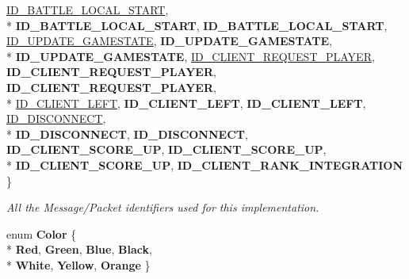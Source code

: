 \begin{DoxyCompactItemize}
\hyperlink{namespace_champ_net_plugin_a2ade5cfa7cf6c25ab7236c6b54a57821ab54454887b51006a69a632ca6a13aab6}{I\-D\-\_\-\-B\-A\-T\-T\-L\-E\-\_\-\-L\-O\-C\-A\-L\-\_\-\-S\-T\-A\-R\-T}, 
\\*
{\bfseries I\-D\-\_\-\-B\-A\-T\-T\-L\-E\-\_\-\-L\-O\-C\-A\-L\-\_\-\-S\-T\-A\-R\-T}, 
{\bfseries I\-D\-\_\-\-B\-A\-T\-T\-L\-E\-\_\-\-L\-O\-C\-A\-L\-\_\-\-S\-T\-A\-R\-T}, 
\hyperlink{namespace_champ_net_plugin_a2ade5cfa7cf6c25ab7236c6b54a57821a6c390584862af2434c946e375365fe02}{I\-D\-\_\-\-U\-P\-D\-A\-T\-E\-\_\-\-G\-A\-M\-E\-S\-T\-A\-T\-E}, 
{\bfseries I\-D\-\_\-\-U\-P\-D\-A\-T\-E\-\_\-\-G\-A\-M\-E\-S\-T\-A\-T\-E}, 
\\*
{\bfseries I\-D\-\_\-\-U\-P\-D\-A\-T\-E\-\_\-\-G\-A\-M\-E\-S\-T\-A\-T\-E}, 
\hyperlink{namespace_champ_net_plugin_a2ade5cfa7cf6c25ab7236c6b54a57821a95ea635e1f4775e77d635b7039a9711e}{I\-D\-\_\-\-C\-L\-I\-E\-N\-T\-\_\-\-R\-E\-Q\-U\-E\-S\-T\-\_\-\-P\-L\-A\-Y\-E\-R}, 
{\bfseries I\-D\-\_\-\-C\-L\-I\-E\-N\-T\-\_\-\-R\-E\-Q\-U\-E\-S\-T\-\_\-\-P\-L\-A\-Y\-E\-R}, 
{\bfseries I\-D\-\_\-\-C\-L\-I\-E\-N\-T\-\_\-\-R\-E\-Q\-U\-E\-S\-T\-\_\-\-P\-L\-A\-Y\-E\-R}, 
\\*
\hyperlink{namespace_champ_net_plugin_a2ade5cfa7cf6c25ab7236c6b54a57821a170a6a655b34086567c4039a8e9ba81d}{I\-D\-\_\-\-C\-L\-I\-E\-N\-T\-\_\-\-L\-E\-F\-T}, 
{\bfseries I\-D\-\_\-\-C\-L\-I\-E\-N\-T\-\_\-\-L\-E\-F\-T}, 
{\bfseries I\-D\-\_\-\-C\-L\-I\-E\-N\-T\-\_\-\-L\-E\-F\-T}, 
\hyperlink{namespace_champ_net_plugin_a2ade5cfa7cf6c25ab7236c6b54a57821ab64ca706dd3c8029ea9dc9a239237e15}{I\-D\-\_\-\-D\-I\-S\-C\-O\-N\-N\-E\-C\-T}, 
\\*
{\bfseries I\-D\-\_\-\-D\-I\-S\-C\-O\-N\-N\-E\-C\-T}, 
{\bfseries I\-D\-\_\-\-D\-I\-S\-C\-O\-N\-N\-E\-C\-T}, 
{\bfseries I\-D\-\_\-\-C\-L\-I\-E\-N\-T\-\_\-\-S\-C\-O\-R\-E\-\_\-\-U\-P}, 
{\bfseries I\-D\-\_\-\-C\-L\-I\-E\-N\-T\-\_\-\-S\-C\-O\-R\-E\-\_\-\-U\-P}, 
\\*
{\bfseries I\-D\-\_\-\-C\-L\-I\-E\-N\-T\-\_\-\-S\-C\-O\-R\-E\-\_\-\-U\-P}, 
{\bfseries I\-D\-\_\-\-C\-L\-I\-E\-N\-T\-\_\-\-R\-A\-N\-K\-\_\-\-I\-N\-T\-E\-G\-R\-A\-T\-I\-O\-N}
 \}
\begin{DoxyCompactList}\small\item\em All the Message/\-Packet identifiers used for this implementation. \end{DoxyCompactList}\item 
enum {\bfseries Color} \{ \\*
{\bfseries Red}, 
{\bfseries Green}, 
{\bfseries Blue}, 
{\bfseries Black}, 
\\*
{\bfseries White}, 
{\bfseries Yellow}, 
{\bfseries Orange}
 \}
\end{DoxyCompactItemize}

